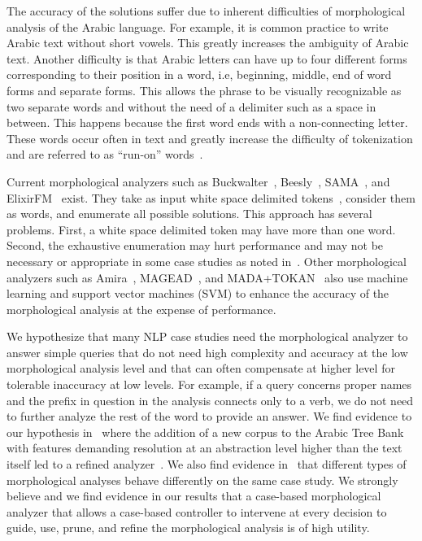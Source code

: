 \documentclass[11pt,letterpaper]{article}
\begin{document}
\novocalize
The accuracy of the solutions suffer due to inherent difficulties
of morphological analysis of the Arabic language. 
For example, it is common practice to write Arabic text
without short vowels. 
This greatly increases the ambiguity of Arabic text. 
Another difficulty is that  Arabic letters can have up to 
four different forms
corresponding to their position in a word, i.e, beginning,
middle, end of word forms and separate forms. 
This allows the phrase 
to be visually recognizable
as two separate words  and  without 
the need of a delimiter such as a space in between. 
This happens because the first word  ends with
 a non-connecting letter. 
These words occur often in text and greatly increase the
difficulty of tokenization and are referred to as 
``run-on'' words~\cite{Buckwalter:04}.

Current morphological analyzers such as 
Buckwalter~,
Beesly~, SAMA~\cite{Kulick:10},
and ElixirFM~\cite{Otakar:07} exist.
They take as input white space delimited tokens~\cite{Kulick:10},
consider them as words,
and enumerate all possible solutions. 
This approach has several problems. 
First, 
a white space delimited token may have 
more than one word.
Second, the exhaustive enumeration may hurt performance and may
not be necessary or appropriate
in some case studies as noted in~\cite{Maamouri:10}. 
Other morphological analyzers such as Amira~\cite{Diab:07,Benajiba:07},
MAGEAD~\cite{Habash:05}, and MADA+TOKAN~\cite{Habash:09} 
also use machine learning and support vector machines (SVM) 
to enhance the accuracy of the morphological analysis at the expense 
of performance.

We hypothesize that many NLP case studies need the 
morphological analyzer to answer simple queries that do not need 
high complexity and accuracy at the low morphological analysis level 
and that can often compensate at higher level for tolerable inaccuracy at low levels. 
For example, if a query concerns proper names and the 
prefix in question in the analysis connects only to a verb, 
we do not need to further analyze the rest of the word 
to provide an answer.
We find evidence to our hypothesis in~\cite{Maamouri:10} where the 
addition of a new corpus to the Arabic Tree Bank~\cite{Maamouri:04}
with features demanding resolution at an abstraction level
higher than the text itself
led to a refined analyzer~\cite{Kulick:10}.  
We also find evidence in~\cite{Habash:06} that different types of 
morphological analyses behave differently on the same case study. 
We strongly believe and we find evidence in our results that a 
case-based morphological analyzer that allows a case-based
controller to intervene at every decision to 
guide, use, prune, and refine the morphological analysis
is of high utility.
\end{document}
